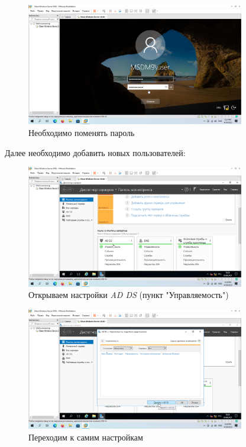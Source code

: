 \documentclass[a4paper]{article}
\begin{document}
  \begin{figure}[H]
    \centering
    \includegraphics[width=0.85\textwidth]{Screenshot_63}
    \caption{Необходимо поменять пароль}
    \label{img:63}
  \end{figure}

  Далее необходимо добавить новых пользователей:

  \begin{figure}[H]
    \centering
    \includegraphics[width=0.85\textwidth]{Screenshot_64}
    \caption{Открываем настройки \textit{AD DS} (пункт "Управляемость")}
    \label{img:64}
  \end{figure}

  \begin{figure}[H]
    \centering
    \includegraphics[width=0.85\textwidth]{Screenshot_65}
    \caption{Переходим к самим настройкам}
    \label{img:65}
  \end{figure}
\end{document}
